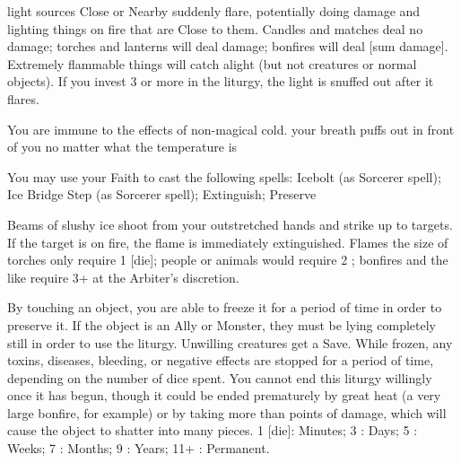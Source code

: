 {\LITURGY [
  Name= Roaring Flames,
  Link=xotli-liturgy-roaring flames,
  Paradigm= Elements ,
  Save=  N ,
  Duration= 0 ,
  Counter=  n/a  ,
  Keywords= None ,
  Target=   Close or Nearby flames
]



\DICE light sources Close or Nearby suddenly flare, potentially doing damage and lighting things on fire that are Close to them.  Candles and matches deal no damage; torches and lanterns will deal \DICE damage; bonfires will deal [sum damage].  Extremely flammable things will catch alight (but not creatures or normal objects).  If you invest 3 or more \DICE in the liturgy, the light is snuffed out after it flares. 


\GOD[
Name=Ymir,
Link=small-god-ymir,
GodOf=Archon of Ice and Snow,
Holy=Quartz stones affixed to a pair of leather or iron bracers
]


You are immune to the effects of non-magical cold. your breath puffs out in front of you no matter what the temperature is


You may use your Faith to cast the following spells: Icebolt (as Sorcerer spell); Ice Bridge Step (as Sorcerer spell); Extinguish; Preserve

\LITURGY [
  Name= Extinguish,
  Link= ymir-liturgy-extinguish,
  Paradigm= Elements ,
  Save=  N ,
  Duration= 0 ,
  Counter=  n/a  ,
  Keywords= Splittable ,
  Target=   Close or Nearby target(s)
]



Beams of slushy ice shoot from your outstretched hands and strike up to \DICE targets.  If the target is on fire, the flame is immediately extinguished.  Flames the size of torches only require 1 [die]; people or animals would require 2 \DICE; bonfires and the like require 3+ \DICE at the Arbiter's discretion.

\LITURGY [
  Name= Preserve,
  Link=ymir-liturgy-preserve,
  Paradigm= Elements ,
  Save=  Y (negates) ,
  Duration= varies ,
  Counter=  n/a  ,
  Keywords= None ,
  Target=   Close object or creature (touch)
]



By touching an object, you are able to freeze it for a period of time in order to preserve it.  If the object is an Ally or Monster, they must be lying completely still in order to use the liturgy.  Unwilling creatures get a Save.  While frozen, any toxins, diseases, bleeding, or negative effects are stopped for a period of time, depending on the number of dice spent.  You cannot end this liturgy willingly once it has begun, though it could be ended prematurely by great heat (a very large bonfire, for example) or by taking more than \SUMDICE points of damage, which will cause the object to shatter into many pieces.  
1 [die]: Minutes; 3 \DICE: Days; 5 \DICE: Weeks; 7 \DICE: Months; 9 \DICE: Years; 11+ \DICE: Permanent. 


}

